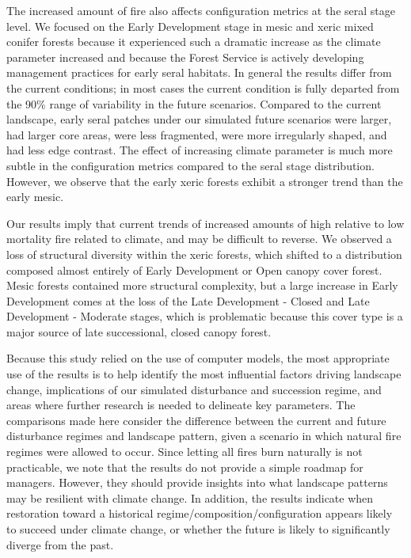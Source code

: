 The increased amount of fire also affects configuration metrics at the seral stage level. We focused on the Early Development stage in mesic and xeric mixed conifer forests because it experienced such a dramatic increase as the climate parameter increased and because the Forest Service is actively developing management practices for early seral habitats. In general the results differ from the current conditions; in most cases the current condition is fully departed from the 90\% range of variability in the future scenarios. Compared to the current landscape, early seral patches under our simulated future scenarios were larger, had larger core areas, were less fragmented, were more irregularly shaped, and had less edge contrast. The effect of increasing climate parameter is much more subtle in the configuration metrics compared to the seral stage distribution. However, we observe that the early xeric forests exhibit a stronger trend than the early mesic. 

Our results imply that current trends of increased amounts of high relative to low mortality fire related to climate, and may be difficult to reverse. We observed a loss of structural diversity within the xeric forests, which shifted to a distribution composed almost entirely of Early Development or Open canopy cover forest. Mesic forests contained more structural complexity, but a large increase in Early Development comes at the loss of the Late Development - Closed and Late Development - Moderate stages, which is problematic because this cover type is a major source of late successional, closed canopy forest.

Because this study relied on the use of computer models, the most appropriate use of the results is to help identify the most influential factors driving landscape change, implications of our simulated disturbance and succession regime, and areas where further research is needed to delineate key parameters. The comparisons made here consider the difference between the current and future disturbance regimes and landscape pattern, given a scenario in which natural fire regimes were allowed to occur. Since letting all fires burn naturally is not practicable, we note that the results do not provide a simple roadmap for managers. However, they should provide insights into what landscape patterns may be resilient with climate change. In addition, the results indicate when restoration toward a historical regime/composition/configuration appears likely to succeed under climate change, or whether the future is likely to significantly diverge from the past. 

